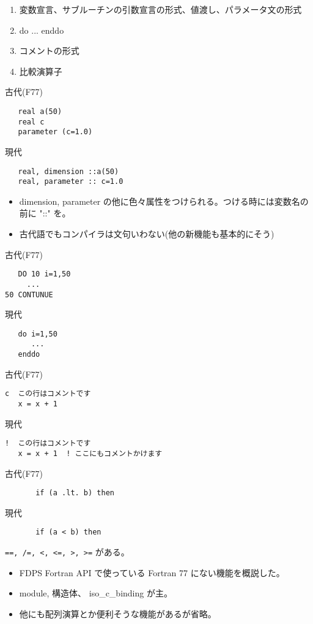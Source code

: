 \documentclass[12pt,dvipdfmx]{article}
\begin{document}

\begin{enumerate}

\item 変数宣言、サブルーチンの引数宣言の形式、値渡し、パラメータ文の形式
\item do ... enddo
\item コメントの形式
\item 比較演算子
\end{enumerate}


古代(F77)
\begin{verbatim}
   real a(50)
   real c
   parameter (c=1.0)
\end{verbatim}

現代
\begin{verbatim}
   real, dimension ::a(50)
   real, parameter :: c=1.0
\end{verbatim}

\begin{itemize}
\item dimension, parameter の他に色々属性をつけられる。つける時には変数名の
前に "::" を。
\item 古代語でもコンパイラは文句いわない(他の新機能も基本的にそう)

\end{itemize}


古代(F77)
\begin{verbatim}
   DO 10 i=1,50
     ...
50 CONTUNUE   

\end{verbatim}

現代
\begin{verbatim}
   do i=1,50
      ...
   enddo
\end{verbatim}


古代(F77)
\begin{verbatim}
c  この行はコメントです
   x = x + 1
\end{verbatim}

現代
\begin{verbatim}
!  この行はコメントです
   x = x + 1  ! ここにもコメントかけます
\end{verbatim}


古代(F77)
\begin{verbatim}
       if (a .lt. b) then
\end{verbatim}

現代
\begin{verbatim}
       if (a < b) then
\end{verbatim}
{\tt ==, /=, <, <=, >, >=} がある。


\begin{itemize}

\item FDPS Fortran API で使っている Fortran 77 にない機能を概説した。

\item module, 構造体、 iso\_c\_binding が主。



\item 他にも配列演算とか便利そうな機能があるが省略。

\end{itemize}
\end{document}
